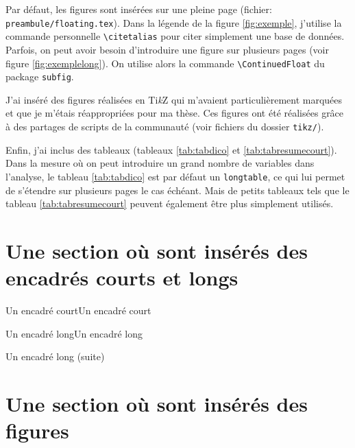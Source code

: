 Par défaut, les figures sont insérées sur une pleine page (fichier: \verb!preambule/floating.tex!). 
Dans la légende de la figure \ref{fig:exemple}, j'utilise la commande personnelle \verb!\citetalias! pour citer simplement une base de données. Parfois, on peut avoir besoin d'introduire une figure sur plusieurs pages (voir figure \ref{fig:exemplelong}). On utilise alors la commande \verb!\ContinuedFloat! du package \verb!subfig!. 

J'ai inséré des figures réalisées en Ti\textit{k}Z qui m'avaient particulièrement marquées et que je m'étais réappropriées pour ma thèse. Ces figures ont été réalisées grâce à des partages de scripts de la communauté (voir fichiers du dossier \verb!tikz/!).

Enfin, j'ai inclus des tableaux (tableaux \ref{tab:tabdico} et \ref{tab:tabresumecourt}). Dans la mesure où on peut introduire un grand nombre de variables dans l'analyse, le tableau \ref{tab:tabdico} est par défaut un \verb!longtable!, ce qui lui permet de s'étendre sur plusieurs pages le cas échéant. Mais de petits tableaux tels que le tableau \ref{tab:tabresumecourt} peuvent également être plus simplement utilisés.

\section[Des encadrés]{Une section où sont insérés des encadrés courts et longs}\label{sec:21}

\lipsum[4]

\begin{frameenv}{Un encadré court}{Un encadré court}\label{enc:court}

\end{frameenv}

\lipsum[5]

\lipsum[6]

\lipsum[7]

\begin{frameenv}{Un encadré long}{Un encadré long}\label{enc:long}

\end{frameenv}
\begin{frameenv*}{}{Un encadré long (suite)}\label{enc:long2}

\end{frameenv*}

\lipsum[8]

\lipsum[9]

\section[Des figures]{Une section où sont insérés des figures}\label{sec:22}

